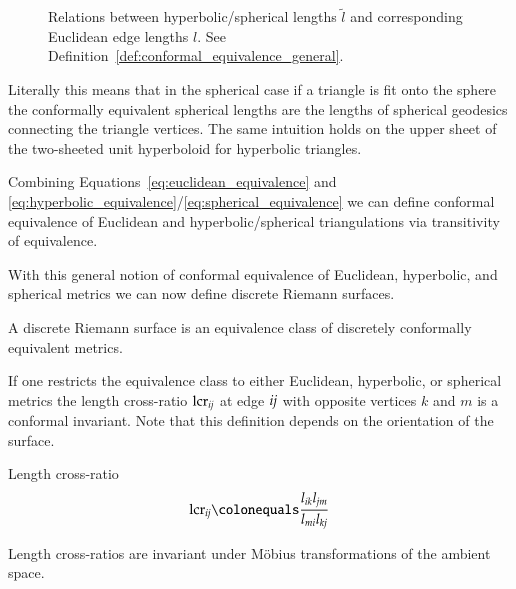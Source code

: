 \documentclass[Thesis.tex]{subfiles}
\begin{document}
\begin{figure}
\centering
\scalebox{0.5}{}
\caption[Conformal equivalence of Euclidean and hyperbolic/spherical metrics]{Relations between hyperbolic/spherical lengths $\tilde l$ and corresponding Euclidean edge lengths $l$. See Definition~\ref{def:conformal_equivalence_general}.}
\label{fig:conformal_equivalence_sph_hyp}
\end{figure}

Literally this means that in the spherical case if a triangle is fit onto the sphere the conformally equivalent spherical lengths are the lengths of spherical geodesics connecting the triangle vertices. 
The same intuition holds on the upper sheet of the two-sheeted unit hyperboloid for hyperbolic triangles.

Combining Equations~\ref{eq:euclidean_equivalence} and \ref{eq:hyperbolic_equivalence}/\ref{eq:spherical_equivalence} we can define conformal equivalence of Euclidean and hyperbolic/spherical triangulations via transitivity of equivalence.

With this general notion of conformal equivalence of Euclidean, hyperbolic, and spherical metrics we can now define discrete Riemann surfaces.

\begin{definition}
\label{def:discrete_riemann_surface}
A discrete Riemann surface is an equivalence class of discretely conformally equivalent metrics.
\end{definition}

If one restricts the equivalence class to either Euclidean, hyperbolic, or spherical metrics the length cross-ratio $\mathrm{lcr}_{\it{ij}}$ at edge $\it{ij}$ with opposite vertices $k$ and $m$ is a conformal invariant. Note that this definition depends on the orientation of the surface.

\begin{definition}{Length cross-ratio}
\begin{equation}
	\mathrm{lcr}_{\it{ij}} \colonequals \frac{l_{\it{ik}} l_{\it{jm}}} {l_{\it{mi}} l_{\it{kj}}} \label{eq:length_cross_ratio}
\end{equation}
\end{definition}

\begin{theorem}
\label{thm:moebius_invariance}
Length cross-ratios are invariant under M{\"o}bius transformations of the ambient space.
\end{theorem}
\end{document}
